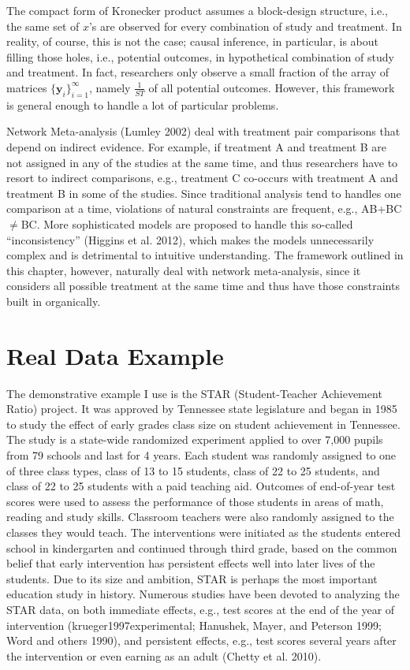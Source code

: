 The compact form of Kronecker product assumes a block-design structure,
i.e., the same set of \(x\)'s are observed for every combination of
study and treatment. In reality, of course, this is not the case; causal
inference, in particular, is about filling those holes, i.e., potential
outcomes, in hypothetical combination of study and treatment. In fact,
researchers only observe a small fraction of the array of matrices
\(\{\bm y_i\}_{i=1}^\infty\), namely \(\frac{1}{ST}\) of all potential
outcomes. However, this framework is general enough to handle a lot of
particular problems.

Network Meta-analysis (Lumley 2002) deal with treatment pair comparisons
that depend on indirect evidence. For example, if treatment A and
treatment B are not assigned in any of the studies at the same time, and
thus researchers have to resort to indirect comparisons, e.g., treatment
C co-occurs with treatment A and treatment B in some of the studies.
Since traditional analysis tend to handles one comparison at a time,
violations of natural constraints are frequent, e.g., AB+BC\(\neq\)BC.
More sophisticated models are proposed to handle this so-called
``inconsistency'' (Higgins et al. 2012), which makes the models
unnecessarily complex and is detrimental to intuitive understanding. The
framework outlined in this chapter, however, naturally deal with network
meta-analysis, since it considers all possible treatment at the same
time and thus have those constraints built in organically.

\section{Real Data Example}\label{real-data-example}

The demonstrative example I use is the STAR (Student-Teacher Achievement
Ratio) project. It was approved by Tennessee state legislature and began
in 1985 to study the effect of early grades class size on student
achievement in Tennessee. The study is a state-wide randomized
experiment applied to over 7,000 pupils from 79 schools and last for 4
years. Each student was randomly assigned to one of three class types,
class of 13 to 15 students, class of 22 to 25 students, and class of 22
to 25 students with a paid teaching aid. Outcomes of end-of-year test
scores were used to assess the performance of those students in areas of
math, reading and study skills. Classroom teachers were also randomly
assigned to the classes they would teach. The interventions were
initiated as the students entered school in kindergarten and continued
through third grade, based on the common belief that early intervention
has persistent effects well into later lives of the students. Due to its
size and ambition, STAR is perhaps the most important education study in
history. Numerous studies have been devoted to analyzing the STAR data,
on both immediate effects, e.g., test scores at the end of the year of
intervention (krueger1997experimental; Hanushek, Mayer, and Peterson
1999; Word and others 1990), and persistent effects, e.g., test scores
several years after the intervention or even earning as an adult (Chetty
et al. 2010).

